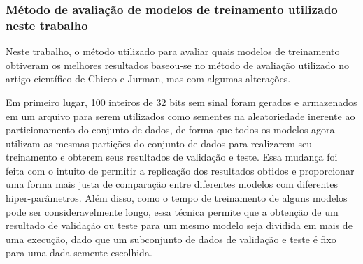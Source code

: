 \subsubsection{Método de avaliação de modelos de treinamento utilizado neste trabalho}

Neste trabalho, o método utilizado para avaliar quais modelos de treinamento obtiveram os melhores resultados baseou-se no método de avaliação utilizado no artigo científico de Chicco e Jurman, mas com algumas alterações.

Em primeiro lugar, 100 inteiros de 32 bits sem sinal foram gerados e armazenados em um arquivo para serem utilizados como sementes na aleatoriedade inerente ao particionamento do conjunto de dados\cite{larxel_dataset}, de forma que todos os modelos agora utilizam as mesmas partições do conjunto de dados para realizarem seu treinamento e obterem seus resultados de validação e teste. Essa mudança foi feita com o intuito de permitir a replicação dos resultados obtidos e proporcionar uma forma mais justa de comparação entre diferentes modelos com diferentes hiper-parâmetros. Além disso, como o tempo de treinamento de alguns modelos pode ser consideravelmente longo, essa técnica permite que a obtenção de um resultado de validação ou teste para um mesmo modelo seja dividida em mais de uma execução, dado que um subconjunto de dados de validação e teste é fixo para uma dada semente escolhida.

